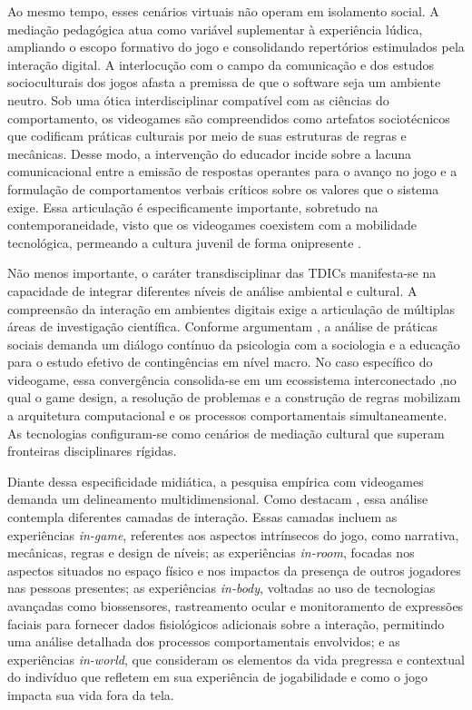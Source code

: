 \documentclass[portuguese]{textolivre}
\begin{document}
Ao mesmo tempo, esses cenários virtuais não operam em isolamento social. A mediação pedagógica atua como variável suplementar à experiência lúdica, ampliando o escopo formativo do jogo e consolidando repertórios estimulados pela interação digital. A interlocução com o campo da comunicação e dos estudos socioculturais dos jogos \cite{mendes2023leitura,nascimento2025retorica} afasta a premissa de que o software seja um ambiente neutro. Sob uma ótica interdisciplinar compatível com as ciências do comportamento, os videogames são compreendidos como artefatos sociotécnicos que codificam práticas culturais por meio de suas estruturas de regras e mecânicas. Desse modo, a intervenção do educador incide sobre a lacuna comunicacional entre a emissão de respostas operantes para o avanço no jogo e a formulação de comportamentos verbais críticos sobre os valores que o sistema exige. Essa articulação é especificamente importante, sobretudo na contemporaneidade, visto que os videogames coexistem com a mobilidade tecnológica, permeando a cultura juvenil de forma onipresente \cite{bogost2011how}.

Não menos importante, o caráter transdisciplinar das TDICs manifesta-se na capacidade de integrar diferentes níveis de análise ambiental e cultural. A compreensão da interação em ambientes digitais exige a articulação de múltiplas áreas de investigação científica. Conforme argumentam  \textcite{todorov2004analise}, a análise de práticas sociais demanda um diálogo contínuo da psicologia com a sociologia e a educação para o estudo efetivo de contingências em nível macro. No caso específico do videogame, essa convergência consolida-se em um ecossistema interconectado \cite{jenkins2006convergence},no qual o game design, a resolução de problemas e a construção de regras mobilizam a arquitetura computacional e os processos comportamentais simultaneamente. As tecnologias configuram-se como cenários de mediação cultural que superam fronteiras disciplinares rígidas.

Diante dessa especificidade midiática, a pesquisa empírica com videogames demanda um delineamento multidimensional. Como destacam \textcite{lieberoth2015mixed}, essa análise contempla diferentes camadas de interação. Essas camadas incluem as experiências \textit{in-game}, referentes aos aspectos intrínsecos do jogo, como narrativa, mecânicas, regras e design de níveis; as experiências \textit{in-room}, focadas nos aspectos situados no espaço físico e nos impactos da presença de outros jogadores nas pessoas presentes; as experiências \textit{in-body}, voltadas ao uso de tecnologias avançadas como biossensores, rastreamento ocular e monitoramento de expressões faciais para fornecer dados fisiológicos adicionais sobre a interação, permitindo uma análise detalhada dos processos comportamentais envolvidos; e as experiências \textit{in-world}, que consideram os elementos da vida pregressa e contextual do indivíduo que refletem em sua experiência de jogabilidade e como o jogo impacta sua vida fora da tela.
\end{document}
